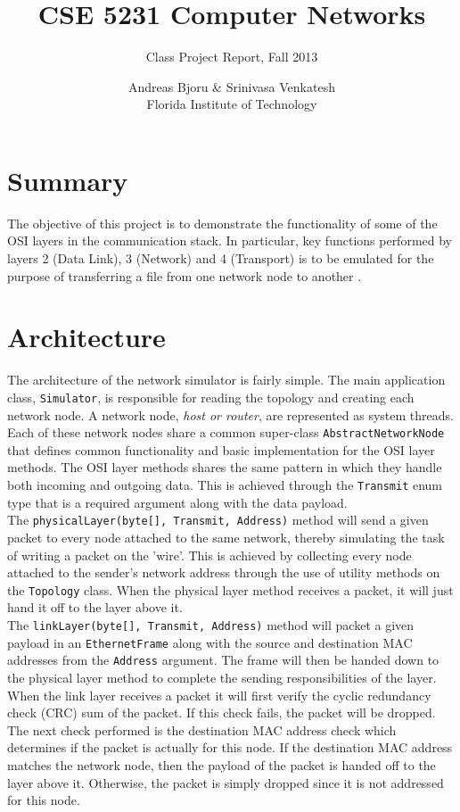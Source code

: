 \documentclass{scrartcl}
\begin{document}
\author{Andreas Bjoru \& Srinivasa Venkatesh\\ Florida Institute of Technology}
\title{CSE 5231 Computer Networks}
\subtitle{Class Project Report, Fall 2013}
\renewcommand{\today}{November 26, 2013}
\maketitle
\tableofcontents
\newpage

\section{Summary}
The objective of this project is to demonstrate the functionality of some of the OSI layers in the communication stack. In particular, key functions performed by layers 2 (Data Link), 3 (Network) and 4 (Transport) is to be emulated for the purpose of transferring a file from one network node to another \cite{assignment}. 

\section{Architecture}
The architecture of the network simulator is fairly simple. The main application class, \texttt{Simulator}, is responsible for reading the topology and creating each network node. A network node, \textit{host or router}, are represented as system threads. Each of these network nodes share a common super-class \texttt{AbstractNetworkNode} that defines common functionality and basic implementation for the OSI layer methods. The OSI layer methods shares the same pattern in which they handle both incoming and outgoing data. This is achieved through the \texttt{Transmit} enum type that is a required argument along with the data payload. \\

The \texttt{physicalLayer(byte[], Transmit, Address)} method will send a given packet to every node attached to the same network, thereby simulating the task of writing a packet on the 'wire'. This is achieved by collecting every node attached to the sender's network address through the use of utility methods on the \texttt{Topology} class. When the physical layer method receives a packet, it will just hand it off to the layer above it.\\

The \texttt{linkLayer(byte[], Transmit, Address)} method will packet a given payload in an \texttt{EthernetFrame} along with the source and destination MAC addresses from the \texttt{Address} argument. The frame will then be handed down to the physical layer method to complete the sending responsibilities of the layer. When the link layer receives a packet it will first verify the cyclic redundancy check (CRC) sum of the packet. If this check fails, the packet will be dropped. The next check performed is the destination MAC address check which determines if the packet is actually for this node. If the destination MAC address matches the network node, then the payload of the packet is handed off to the layer above it. Otherwise, the packet is simply dropped since it is not addressed for this node.\\
\end{document}
